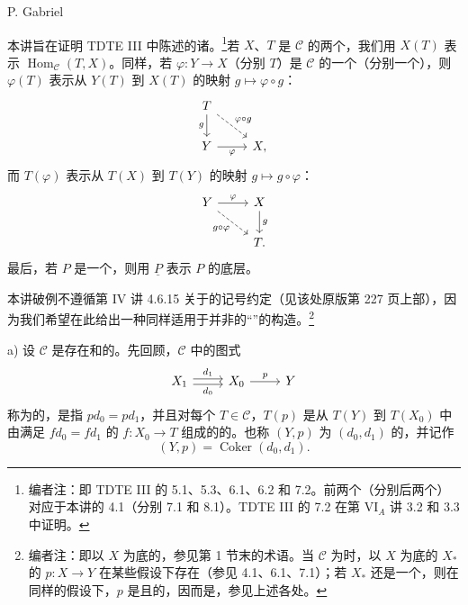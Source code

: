 \begin{center}P. Gabriel\end{center}
本讲旨在证明 TDTE III 中陈述的诸。\footnote{编者注：即 TDTE III 的 5.1、5.3、6.1、6.2 和 7.2。前两个（分别后两个）对应于本讲的 4.1（分别 7.1 和 8.1）。TDTE III 的 7.2 在第 VI$_A$ 讲 3.2 和 3.3 中证明。}若 $X$、$T$ 是 $\mathcal C$ 的两个，我们用 $X(T)$ 表示 $\operatorname{Hom}_{\mathcal C}(T,X)$。同样，若 $\varphi:Y\to X$（分别 $T$）是 $\mathcal C$ 的一个（分别一个），则 $\varphi(T)$ 表示从 $Y(T)$ 到 $X(T)$ 的映射 $g\mapsto\varphi\circ g$：
\[
\begin{tikzcd}
T\arrow[d,"g"']\arrow[dr,dashed,"\varphi\circ g"]&\\
Y\arrow[r,"\varphi"']&X,
\end{tikzcd}
\]
而 $T(\varphi)$ 表示从 $T(X)$ 到 $T(Y)$ 的映射 $g\mapsto g\circ\varphi$：
\[
\begin{tikzcd}
Y\arrow[r,"\varphi"]\arrow[dr,dashed,"g\circ\varphi"']&X\arrow[d,"g"]\\
&T.
\end{tikzcd}
\]
最后，若 $P$ 是一个，则用 $\underline P$ 表示 $P$ 的底层。

本讲破例不遵循第 IV 讲 4.6.15 关于的记号约定（见该处原版第 227 页上部），因为我们希望在此给出一种同样适用于并非的“”的构造。\footnote{编者注：即以 $X$ 为底的，参见第 1 节末的术语。当 $\mathcal C$ 为时，以 $X$ 为底的 $X_*$ 的 $p:X\to Y$ 在某些假设下存在（参见 4.1、6.1、7.1）；若 $X_*$ 还是一个，则在同样的假设下，$p$ 是且的，因而是，参见上述各处。}

a) 设 $\mathcal C$ 是存在和的。先回顾，$\mathcal C$ 中的图式
\[
\begin{tikzcd}
X_1\arrow[r,shift left=.5ex,"d_1"]\arrow[r,shift right=.5ex,"d_0"']&X_0\arrow[r,"p"]&Y
\end{tikzcd}
\]
称为的，是指 $pd_0=pd_1$，并且对每个 $T\in\mathcal C$，$T(p)$ 是从 $T(Y)$ 到 $T(X_0)$ 中由满足 $fd_0=fd_1$ 的 $f:X_0\to T$ 组成的的。也称 $(Y,p)$ 为 $(d_0,d_1)$ 的，并记作
\[(Y,p)=\operatorname{Coker}(d_0,d_1).\]

